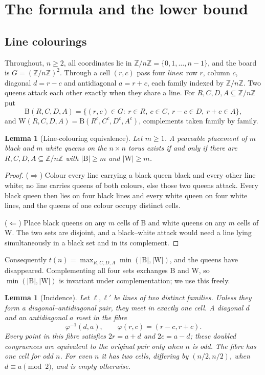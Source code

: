 \documentclass[11pt]{amsart}
\newtheorem{lemma}[theorem]{Lemma}
\theoremstyle{definition}
\theoremstyle{remark}
\newcommand{\Z}{\mathbb{Z}}
\newcommand{\Zn}{\Z/n\Z}
\newcommand{\Bl}{\mathrm{B}}
\newcommand{\Wh}{\mathrm{W}}
\begin{document}
\section{The formula and the lower bound}\label{sec:formula}

\subsection{Line colourings}

Throughout, $n\ge2$, all coordinates lie in $\Zn=\{0,1,\dots,n-1\}$, and the board is $G=(\Zn)^2$. Through a cell $(r,c)$ pass four \emph{lines}: row $r$, column $c$, diagonal $d=r-c$ and antidiagonal $a=r+c$, each family indexed by $\Zn$. Two queens attack each other exactly when they share a line. For $R,C,D,A\subseteq\Zn$ put
\[
\Bl(R,C,D,A)=\{(r,c)\in G:\ r\in R,\ c\in C,\ r-c\in D,\ r+c\in A\},
\]
and $\Wh(R,C,D,A)=\Bl(R^{c},C^{c},D^{c},A^{c})$, complements taken family by family.

\begin{lemma}[Line-colouring equivalence]\label{lem:lines}
Let $m\ge1$. A peaceable placement of $m$ black and $m$ white queens on the $n\times n$ torus exists if and only if there are $R,C,D,A\subseteq\Zn$ with $|\Bl|\ge m$ and $|\Wh|\ge m$.
\end{lemma}

\begin{proof}
($\Rightarrow$) Colour every line carrying a black queen black and every other line white; no line carries queens of both colours, else those two queens attack. Every black queen then lies on four black lines and every white queen on four white lines, and the queens of one colour occupy distinct cells.

($\Leftarrow$) Place black queens on any $m$ cells of $\Bl$ and white queens on any $m$ cells of $\Wh$. The two sets are disjoint, and a black--white attack would need a line lying simultaneously in a black set and in its complement.
\end{proof}

Consequently $t(n)=\max_{R,C,D,A}\min(|\Bl|,|\Wh|)$, and the queens have disappeared. Complementing all four sets exchanges $\Bl$ and $\Wh$, so $\min(|\Bl|,|\Wh|)$ is invariant under complementation; we use this freely.

\begin{lemma}[Incidence]\label{lem:inc}
Let $\ell,\ell'$ be lines of two distinct families.  Unless they form a
diagonal--antidiagonal pair, they meet in exactly one cell.  A diagonal $d$
and an antidiagonal $a$ meet in the fibre
\[
\varphi^{-1}(d,a),\qquad \varphi(r,c)=(r-c,r+c).
\]
Every point in this fibre satisfies $2r=a+d$ and $2c=a-d$; these doubled
congruences are equivalent to the original pair only when $n$ is odd.  The
fibre has one cell for odd $n$.  For even $n$ it has two cells, differing by
$(n/2,n/2)$, when $d\equiv a\pmod2$, and is empty otherwise.
\end{lemma}
\end{document}
